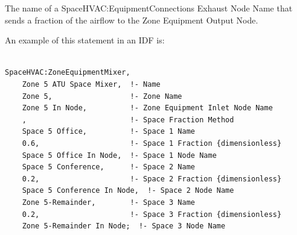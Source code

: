 The name of a SpaceHVAC:EquipmentConnections Exhaust Node Name that sends a fraction of the airflow to the Zone Equipment Output Node.

An example of this statement in an IDF is:

\begin{lstlisting}

SpaceHVAC:ZoneEquipmentMixer,
    Zone 5 ATU Space Mixer,  !- Name
    Zone 5,                  !- Zone Name
    Zone 5 In Node,          !- Zone Equipment Inlet Node Name
    ,                        !- Space Fraction Method
    Space 5 Office,          !- Space 1 Name
    0.6,                     !- Space 1 Fraction {dimensionless}
    Space 5 Office In Node,  !- Space 1 Node Name
    Space 5 Conference,      !- Space 2 Name
    0.2,                     !- Space 2 Fraction {dimensionless}
    Space 5 Conference In Node,  !- Space 2 Node Name
    Zone 5-Remainder,        !- Space 3 Name
    0.2,                     !- Space 3 Fraction {dimensionless}
    Zone 5-Remainder In Node;  !- Space 3 Node Name
\end{lstlisting}

